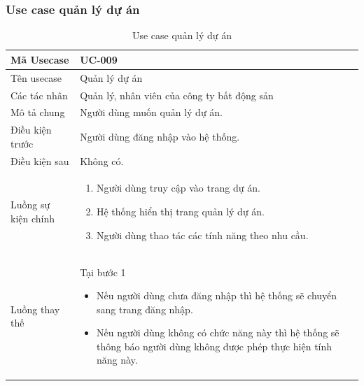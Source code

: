 \documentclass[12pt,a4paper]{article}
\begin{document}
    \subsubsection*{Use case quản lý dự án}
    \begin{table}[H]
        \centering
        \begin{tabular}{|p{3.5cm}|p{11.5cm}|c|}
            \hline
            Mã Usecase      & UC-009                                      \\
            \hline
            Tên usecase     & Quản lý dự án                               \\
            \hline
            Các tác nhân    & Quản lý, nhân viên của công ty bất động sản \\
            \hline
            Mô tả chung     & Người dùng muốn quản lý dự án.              \\
            \hline

            Điều kiện trước & Người dùng đăng nhập vào hệ thống.          \\
            \hline

            Điều kiện sau   & Không có.                                   \\
            \hline

            Luồng sự kiện chính & \vspace{-.8cm}\begin{enumerate}
                                                    \item Người dùng truy cập vào trang dự án.
                                                    \item Hệ thống hiển thị trang quản lý dự án.
                                                    \item Người dùng thao tác các tính năng theo nhu cầu.
            \end{enumerate}
            \\
            \hline
            Luồng thay thế & Tại bước 1\newline
            \vspace{-.8cm}\begin{itemize}
                              \item Nếu người dùng chưa đăng nhập thì hệ thống sẽ chuyển sang trang đăng nhập.
                              \item Nếu người dùng không có chức năng này thì hệ thống sẽ thông báo người dùng không được phép thực hiện tính năng này.
            \end{itemize}

            \\ \hline
        \end{tabular}
        \caption{Use case quản lý dự án}

    \end{table}
\end{document}
